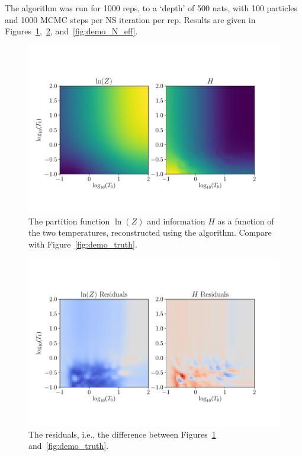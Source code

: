 \documentclass[entropy,article,submit,moreauthors,pdftex,10pt,a4paper]{Definitions/mdpi}
\begin{document}
The algorithm was run for 1000 reps, to a `depth' of 500 nats,
with 100 particles and 1000 MCMC steps per NS iteration per rep.
Results are given in
Figures~\ref{fig:demo_logZ_H},~\ref{fig:demo_residuals},
and~\ref{fig:demo_N_eff}.


\begin{figure}[!ht]
\centering
\includegraphics[scale=0.6]{figures/demo_logZ_H.pdf}
\caption{The partition function $\ln(Z)$ and information $H$ as a function
of the two temperatures, reconstructed using the algorithm. Compare with
Figure~\ref{fig:demo_truth}.
\label{fig:demo_logZ_H}}
\end{figure}

\begin{figure}[!ht]
\centering
\includegraphics[scale=0.6]{figures/demo_residuals.pdf}
\caption{The residuals, i.e., the difference between
Figures~\ref{fig:demo_logZ_H} and~\ref{fig:demo_truth}.
\label{fig:demo_residuals}}
\end{figure}
\end{document}
